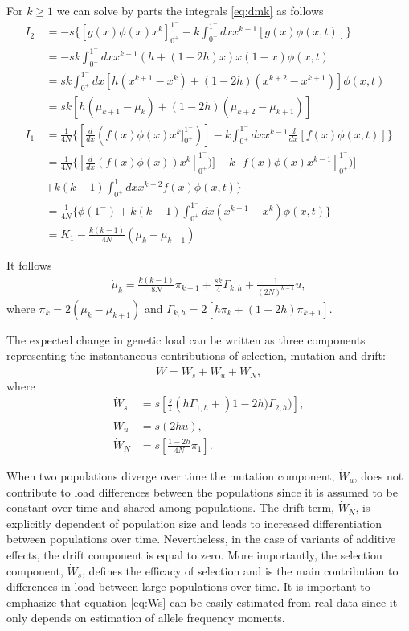 \documentclass[a4paper, 12pt]{article}
\newcommand{\dev}[1]{\ensuremath{\frac{d}{d #1}}}
\begin{document}
For $k \geq 1$ we can solve by parts the integrals \eqref{eq:dmk} as follows
\begin{align}
  I_2 &= -s\{[g(x)\phi(x)x^k]_{0^+}^{1^-} - 
  k \int_{0^+}^{1^-} dx x^{k -1} [g(x)\phi(x,t)]\}  
  \nonumber \\
  &= - sk \int_{0^+}^{1^-} dx x^{k -1} (h + (1 - 2 h)x) x (1 - x)\phi(x,t)  
  \nonumber \\
  &= sk \int_{0^+}^{1^-} dx [h(x^{k + 1} - x^{k}) + 
  (1 - 2 h)(x^{k + 2} - x^{k + 1})]\phi(x,t)
  \nonumber \\
  &= sk [h(\mu_{k + 1} - \mu_{k}) + 
  (1 - 2 h)(\mu_{k + 2} - \mu_{k + 1})]
  \label{eq:I2}
  \\
  I_1 &= \frac{1}{4N}\{[\dev x (f(x)\phi(x)x^k]_{0^+}^{1^-})] - 
      k \int_{0^+}^{1^-} dx x^{k -1} \dev x [f(x)\phi(x,t)]\}
  \nonumber \\
   &= \frac{1}{4N}\{[\dev x (f(x)\phi(x))x^k]_{0^+}^{1^-})] - 
      k[f(x)\phi(x)x^{k-1}]_{0^+}^{1^-})]
      \nonumber \\
  \quad &+ k(k -1) \int_{0^+}^{1^-} dx x^{k - 2} f(x)\phi(x,t)\}
  \nonumber \\
   &= \frac{1}{4N}\{\phi(1^-) + k(k -1) \int_{0^+}^{1^-} dx (x^{k - 1} - x^k ) \phi(x,t)\}
  \nonumber \\
   &= \dot K_1 - \frac{k(k-1)}{4N}(\mu_k - \mu_{k-1})
\end{align}

It follows 
\begin{align}
	\label{eq:dmu_k}
	\dot \mu_k = \frac{k(k-1)}{8N} \pi_{k-1} + \frac{sk}{4}\Gamma_{k,h} + \frac{1}{(2N)^{k-1}}u,
\end{align}
where $\pi_k = 2(\mu_k - \mu_{k+1})$ and $\Gamma_{k,h} = 2[h\pi_k + (1 - 2h)\pi_{k+1}]$.

The expected change in genetic load can be written as three components representing
the instantaneous contributions of selection, mutation and drift: 
\[
	\dot W = \dot W_s + \dot W_u + \dot W_N,
\]
where 
\begin{align}
  \label{eq:Ws}
	\dot W_s &= s \left[ \frac{s}{1}(h\Gamma_{1,h} + )1 - 2h)\Gamma_{2,h})\right], \\
	\dot W_u &= s(2hu), \nonumber\\
	\dot W_N &= s \left[ \frac{1 - 2h}{4N}\pi_1\right].\nonumber
\end{align}

When two populations diverge over time the mutation component, $\dot W_u$, does
not contribute to load differences between the populations since it is assumed
to be constant over time and shared among populations. The drift term, $\dot
W_N$, is explicitly dependent of population size and leads to increased
differentiation  between populations over time.  Nevertheless, in the case of
variants of additive effects, the drift component is equal to zero. More
importantly, the selection component, $\dot W_s$, defines the efficacy of
selection and is the main contribution to differences in load between large
populations over  time.  It is important to emphasize that  equation
\eqref{eq:Ws} can be easily estimated from real data since it only depends on
estimation of allele frequency moments.
\end{document}
